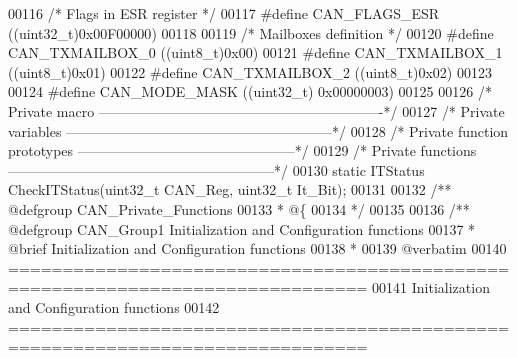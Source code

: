 \begin{DoxyCode}
00116 \textcolor{comment}{/* Flags in ESR register */}
00117 \textcolor{preprocessor}{#}\textcolor{preprocessor}{define} \textcolor{preprocessor}{CAN\_FLAGS\_ESR}     \textcolor{preprocessor}{(}\textcolor{preprocessor}{(}\textcolor{preprocessor}{uint32\_t}\textcolor{preprocessor}{)}0x00F00000\textcolor{preprocessor}{)}
00118 
00119 \textcolor{comment}{/* Mailboxes definition */}
00120 \textcolor{preprocessor}{#}\textcolor{preprocessor}{define} \textcolor{preprocessor}{CAN\_TXMAILBOX\_0}   \textcolor{preprocessor}{(}\textcolor{preprocessor}{(}\textcolor{preprocessor}{uint8\_t}\textcolor{preprocessor}{)}0x00\textcolor{preprocessor}{)}
00121 \textcolor{preprocessor}{#}\textcolor{preprocessor}{define} \textcolor{preprocessor}{CAN\_TXMAILBOX\_1}   \textcolor{preprocessor}{(}\textcolor{preprocessor}{(}\textcolor{preprocessor}{uint8\_t}\textcolor{preprocessor}{)}0x01\textcolor{preprocessor}{)}
00122 \textcolor{preprocessor}{#}\textcolor{preprocessor}{define} \textcolor{preprocessor}{CAN\_TXMAILBOX\_2}   \textcolor{preprocessor}{(}\textcolor{preprocessor}{(}\textcolor{preprocessor}{uint8\_t}\textcolor{preprocessor}{)}0x02\textcolor{preprocessor}{)}
00123 
00124 \textcolor{preprocessor}{#}\textcolor{preprocessor}{define} \textcolor{preprocessor}{CAN\_MODE\_MASK}     \textcolor{preprocessor}{(}\textcolor{preprocessor}{(}\textcolor{preprocessor}{uint32\_t}\textcolor{preprocessor}{)} 0x00000003\textcolor{preprocessor}{)}
00125 
00126 \textcolor{comment}{/* Private macro -------------------------------------------------------------*/}
00127 \textcolor{comment}{/* Private variables ---------------------------------------------------------*/}
00128 \textcolor{comment}{/* Private function prototypes -----------------------------------------------*/}
00129 \textcolor{comment}{/* Private functions ---------------------------------------------------------*/}
00130 \textcolor{keyword}{static} ITStatus CheckITStatus(uint32\_t CAN\_Reg, uint32\_t It\_Bit);
00131 
00132 \textcolor{comment}{/** @defgroup CAN\_Private\_Functions}
00133 \textcolor{comment}{  * @\{}
00134 \textcolor{comment}{  */}
00135 
00136 \textcolor{comment}{/** @defgroup CAN\_Group1 Initialization and Configuration functions}
00137 \textcolor{comment}{ *  @brief    Initialization and Configuration functions }
00138 \textcolor{comment}{ *}
00139 \textcolor{comment}{@verbatim    }
00140 \textcolor{comment}{ ===============================================================================}
00141 \textcolor{comment}{                      Initialization and Configuration functions}
00142 \textcolor{comment}{ ===============================================================================  }

\end{DoxyCode}
